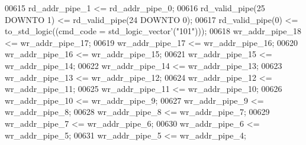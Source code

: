\begin{DoxyCode}
00615         \textcolor{vhdlchar}{rd_addr_pipe_1} \textcolor{vhdlchar}{<=} \textcolor{vhdlchar}{rd_addr_pipe_0};
00616         \textcolor{vhdlchar}{rd_valid_pipe}\textcolor{vhdlchar}{(}\textcolor{vhdllogic}{}\textcolor{vhdllogic}{25} \textcolor{keywordflow}{DOWNTO} \textcolor{vhdllogic}{}\textcolor{vhdllogic}{1}\textcolor{vhdlchar}{)} \textcolor{vhdlchar}{<=} \textcolor{vhdlchar}{rd_valid_pipe}\textcolor{vhdlchar}{(}\textcolor{vhdllogic}{}\textcolor{vhdllogic}{24} \textcolor{keywordflow}{DOWNTO} \textcolor{vhdllogic}{}\textcolor{vhdllogic}{0}\textcolor{vhdlchar}{)};
00617         \textcolor{vhdlchar}{rd_valid_pipe}\textcolor{vhdlchar}{(}\textcolor{vhdllogic}{}\textcolor{vhdllogic}{0}\textcolor{vhdlchar}{)} \textcolor{vhdlchar}{<=} \textcolor{vhdlchar}{to\_std\_logic}\textcolor{vhdlchar}{(}\textcolor{vhdlchar}{(}\textcolor{vhdlchar}{cmd_code} \textcolor{vhdlchar}{=} \textcolor{comment}{std\_logic\_vector}\textcolor{vhdlchar}{'}\textcolor{vhdlchar}{(}\textcolor{vhdllogic}{"101"}\textcolor{vhdlchar}{)}\textcolor{vhdlchar}{)}\textcolor{vhdlchar}{)};
00618         \textcolor{vhdlchar}{wr_addr_pipe_18} \textcolor{vhdlchar}{<=} \textcolor{vhdlchar}{wr_addr_pipe_17};
00619         \textcolor{vhdlchar}{wr_addr_pipe_17} \textcolor{vhdlchar}{<=} \textcolor{vhdlchar}{wr_addr_pipe_16};
00620         \textcolor{vhdlchar}{wr_addr_pipe_16} \textcolor{vhdlchar}{<=} \textcolor{vhdlchar}{wr_addr_pipe_15};
00621         \textcolor{vhdlchar}{wr_addr_pipe_15} \textcolor{vhdlchar}{<=} \textcolor{vhdlchar}{wr_addr_pipe_14};
00622         \textcolor{vhdlchar}{wr_addr_pipe_14} \textcolor{vhdlchar}{<=} \textcolor{vhdlchar}{wr_addr_pipe_13};
00623         \textcolor{vhdlchar}{wr_addr_pipe_13} \textcolor{vhdlchar}{<=} \textcolor{vhdlchar}{wr_addr_pipe_12};
00624         \textcolor{vhdlchar}{wr_addr_pipe_12} \textcolor{vhdlchar}{<=} \textcolor{vhdlchar}{wr_addr_pipe_11};
00625         \textcolor{vhdlchar}{wr_addr_pipe_11} \textcolor{vhdlchar}{<=} \textcolor{vhdlchar}{wr_addr_pipe_10};
00626         \textcolor{vhdlchar}{wr_addr_pipe_10} \textcolor{vhdlchar}{<=} \textcolor{vhdlchar}{wr_addr_pipe_9};
00627         \textcolor{vhdlchar}{wr_addr_pipe_9} \textcolor{vhdlchar}{<=} \textcolor{vhdlchar}{wr_addr_pipe_8};
00628         \textcolor{vhdlchar}{wr_addr_pipe_8} \textcolor{vhdlchar}{<=} \textcolor{vhdlchar}{wr_addr_pipe_7};
00629         \textcolor{vhdlchar}{wr_addr_pipe_7} \textcolor{vhdlchar}{<=} \textcolor{vhdlchar}{wr_addr_pipe_6};
00630         \textcolor{vhdlchar}{wr_addr_pipe_6} \textcolor{vhdlchar}{<=} \textcolor{vhdlchar}{wr_addr_pipe_5};
00631         \textcolor{vhdlchar}{wr_addr_pipe_5} \textcolor{vhdlchar}{<=} \textcolor{vhdlchar}{wr_addr_pipe_4};

\end{DoxyCode}
